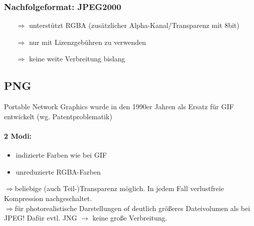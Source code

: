 \subsubsection{Nachfolgeformat: JPEG2000}
\begin{itemize}
\item[$\Rightarrow$] unterstützt RGBA (zusätzlicher Alpha-Kanal/Transparenz mit 8bit)
\item[$\Rightarrow$] nur mit Lizenzgebühren zu verwenden
\item[$\Rightarrow$] keine weite Verbreitung bislang
\end{itemize}

\newpage

\subsection{PNG}
Portable Network Graphics wurde in den 1990er Jahren als Ersatz für GIF entwickelt (wg. Patentproblematik)
\paragraph{2 Modi:} \begin{itemize} \item indizierte Farben wie bei GIF
\item unreduzierte RGBA-Farben\end{itemize}
$\Rightarrow$beliebige (auch Teil-)Transparenz möglich. In jedem Fall verlustfreie Kompression nachgeschaltet.\\
$\Rightarrow$für photorealistische Darstellungen of deutlich größeres Dateivolumen als bei JPEG! Dafür evtl. JNG $\rightarrow$ keine große Verbreitung.
